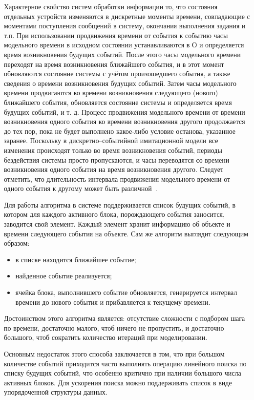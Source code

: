 Характерное свойство систем обработки информации то, что состояния отдельных устройств изменяются в дискретные моменты времени, совпадающие с моментами поступления сообщений в систему, окончания
выполнения задания и т.п. При использовании продвижения времени от события к событию часы модельного времени в исходном состоянии устанавливаются в О и определяется время возникновения будущих событий. После этого часы модельного времени переходят на время возникновения ближайшего события, и в этот момент обновляются состояние системы с учётом произошедшего события, а также сведения о времени возникновения будущих событий. Затем часы модельного времени продвигаются ко времени возникновения следующего (нового) ближайшего события, обновляется состояние системы и определяется время будущих событий, и т. д. Процесс продвижения модельного времени от времени возникновения одного события ко времени возникновения другого продолжается до тех пор, пока не будет выполнено какое-либо условие останова, указанное заранее. Поскольку в дискретно--событийной имитационной модели все изменения происходят только во время возникновения событий, периоды бездействия системы просто пропускаются, и часы переводятся со времени возникновения одного события на время возникновения другого. Следует отметить, что длительность интервала продвижения модельного времени от одного события к другому может быть различной~\cite{time_alg}.

Для работы алгоритма в системе поддерживается список будущих событий, в котором для каждого активного блока, порождающего события заносится, заводится свой элемент. Каждый элемент хранит информацию об объекте и времени следующего события на объекте. Сам же алгоритм выглядит следующим образом:
\begin{itemize}[label=---]
	\item в списке находится ближайшее событие; 
	\item найденное событие реализуется;
	\item ячейка блока, выполнившего событие обновляется, генерируется интервал времени до нового события и прибавляется к текущему времени.
\end{itemize}

Достоинством этого алгоритма является: отсутствие сложности с подбором шага по времени, достаточно малого, чтоб ничего не пропустить, и достаточно большого, чтоб сократить количество итераций при моделировании.

Основным недостаток этого способа заключается в том, что при большом количестве событий приходится часто выполнять операцию линейного поиска по списку будущих событий, что особенно критично при наличии большого числа активных блоков. Для ускорения поиска можно поддерживать список в виде упорядоченной структуры данных.

